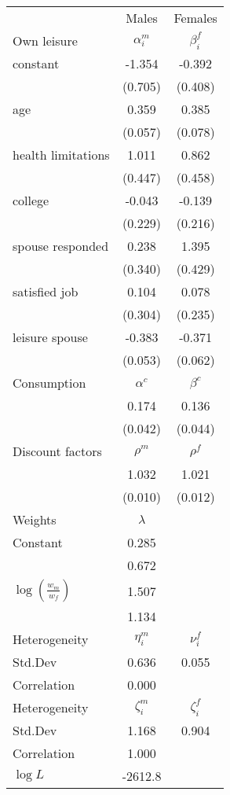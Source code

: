 \begin{tabular}{lcc} 
\hline\hline 
 & Males & Females \\ 
Own leisure & $\alpha_{i}^{m}$ & $\beta_{i}^{f}$ \\ 
constant & -1.354 & -0.392 \\ 
 & (0.705) & (0.408) \\ 
age & 0.359 & 0.385 \\ 
 & (0.057) & (0.078) \\ 
health limitations & 1.011 & 0.862 \\ 
 & (0.447) & (0.458) \\ 
college & -0.043 & -0.139 \\ 
 & (0.229) & (0.216) \\ 
spouse responded & 0.238 & 1.395 \\ 
 & (0.340) & (0.429) \\ 
satisfied job & 0.104 & 0.078 \\ 
 & (0.304) & (0.235) \\ 
leisure spouse & -0.383 & -0.371 \\ 
 & (0.053) & (0.062) \\ 
Consumption & $\alpha^{c}$ & $\beta^{c}$ \\ 
 & 0.174 & 0.136 \\ 
 & (0.042) & (0.044) \\ 
Discount factors & $\rho^m$ & $\rho^f$ \\ 
 & 1.032 & 1.021 \\ 
 & (0.010) & (0.012) \\ 
Weights & $\lambda$ &  \\ 
Constant & 0.285 &  \\ 
 & 0.672 &  \\ 
$\log(\frac{w_m}{w_f})$ & 1.507 &  \\ 
 & 1.134 &  \\ 
Heterogeneity & $\eta_i^m$ & $\nu_i^f$ \\ 
Std.Dev & 0.636 & 0.055 \\ 
Correlation & 0.000 &  \\ 
Heterogeneity & $\zeta_i^m$ & $\zeta_i^f$ \\ 
Std.Dev & 1.168 & 0.904 \\ 
Correlation & 1.000 &  \\ 
\hline 
$\log L$ & -2612.8 & \\ 
\hline \hline 
\end{tabular} 
